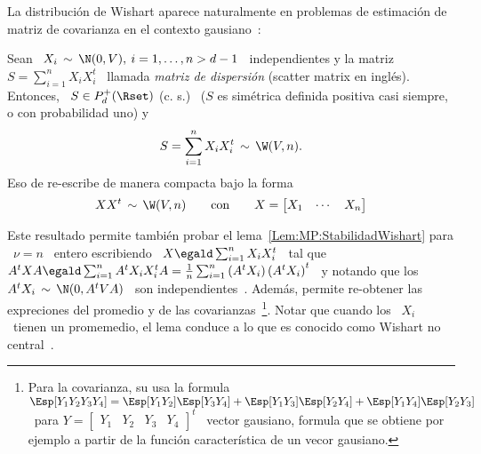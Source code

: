 La distribuci\'on  de Wishart aparece naturalmente en  problemas de estimaci\'on
de matriz de covarianza en el contexto gausiano~\cite{Mui82, BilBre99, GupNad99,
  And03, Seb04, KotNad04}:
%
\begin{lema}\label{Lem:MP:WishartGausiana}
%
  Sean \ $X_i \, \sim \, \N(0,V), \: i = 1, \ldots , n > d-1$ \ independientes y
  la  matriz  \  $S  =  \sum_{i=1}^n   X_i  X_i^t$  \  llamada  {\em  matriz  de
    dispersi\'on} (scatter matrix en ingl\'es). Entonces, \ $S \in P_d^+(\Rset)$
  (c.   s.)   \  ($S$ es  sim\'etrica  definida  positiva  casi siempre,  o  con
  probabilidad uno) y \
  \[
  S = \sum_{i=1}^n X_i X_i^t \,\sim \, \W(V,n).
  \]
  Eso de re-escribe de manera compacta bajo la forma
  \[
  X X^t  \,\sim \, \W(V,n)  \qquad \mbox{con} \qquad  X = \begin{bmatrix}  X_1 &
    \cdots & X_n \end{bmatrix}
  \]
\end{lema}
%
Este resultado  permite tambi\'en probar  el lema~\ref{Lem:MP:StabilidadWishart}
para \ $\nu = n$ \ entero  escribiendo \ $X \egald \sum_{i=1}^n X_i X_i^t$ \ tal
que \ $A^t X A \egald \sum_{i=1}^n A^t X_i X_i^t A = \frac1n \sum_{i=1}^n \left(
  A^t X_i \right)  \left( A^t X_i \right)^t$ \  y notando que los \  $A^t X_i \,
\sim \,  \N(0, A^t V  A)$ \ son independientes~\cite{Seb04}.   Adem\'as, permite
re-obtener las  expreciones del promedio y de  las covarianzas~\footnote{Para la
  covarianza, su usa la formula \ $\Esp[Y_1 Y_2 Y_3 Y_4] = \Esp[Y_1 Y_2]\Esp[Y_3
  Y_4]  + \Esp[Y_1 Y_3]\Esp[Y_2  Y_4] +  \Esp[Y_1 Y_4]\Esp[Y_2  Y_3]$ \  para $Y
  = \begin{bmatrix}  Y_1 & Y_2 &  Y_3 & Y_4 \end{bmatrix}^t$  \ vector gausiano,
  formula que se  obtiene por ejemplo a partir  de la funci\'on caracter\'istica
  de un vecor  gausiano.}. Notar que cuando los \ $X_i$  \ tienen un promemedio,
el  lema conduce  a  lo que  es  conocido como  Wishart no  central~\cite{And03,
  Seb04}.

